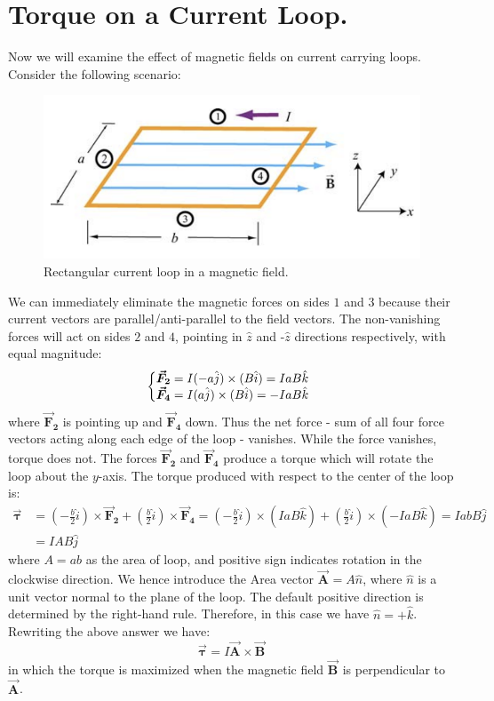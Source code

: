 \documentclass[11pt, letterpaper]{article}
\theoremstyle{definition}
\theoremstyle{remark}
\newcommand{\bv}[2][]{\bm{\vec{#2}_{#1}}}
\begin{document}
\section{Torque on a Current Loop.}\label{sec:loop}
Now we will examine the effect of magnetic fields on current carrying loops. Consider the following scenario:
\begin{figure}[h!]
	\centering
	\includegraphics[scale=0.6]{loop_torque}
	\caption{Rectangular current loop in a magnetic field.}
	\label{fig:torque_loop}
\end{figure}

We can immediately eliminate the magnetic forces on sides $1$ and $3$ because their current vectors are parallel/anti-parallel to the field vectors. The non-vanishing forces will act on sides $2$ and $4$, pointing in $\hat{z}$ and -$\hat{z}$ directions respectively, with equal magnitude:
\[
	\left\{
	\begin{array}{@{}ll@{}}
		\bv[2]{F} = I(-a\hat{j})\times (B\hat{i}) = IaB\hat{k}\\
		\bv[4]{F} = I(a\hat{j})\times (B\hat{i}) = -IaB\hat{k}
		
	\end{array}\right.
\]
where $\bv[2]{F}$ is pointing up and $\bv[4]{F}$ down. Thus the net force - sum of all four force vectors acting along each edge of the loop - vanishes. While the force vanishes, torque does not. The forces $\bv[2]{F}$ and $\bv[4]{F}$ produce a torque which will rotate the loop about the $y$-axis. The torque produced with respect to the center of the loop is:
\[
\begin{split}
	\bv{\tau} &= \left(-\frac b2\hat{i}\right)\times \bv[2]{F} + \left(\frac b2\hat{i}\right)\times\bv[4]{F}
				   = \left(-\frac b2\hat{i}\right)\times (IaB\hat{k}) + \left(\frac b2\hat{i}\right)\times (-IaB\hat{k})
				   = IabB\hat{j}\\
				   &= IAB\hat{j}
\end{split}
\]
where $A = ab$ as the area of loop, and positive sign indicates rotation in the clockwise direction. We hence introduce the Area vector $\bv{A} = A\hat{n}$, where $\hat{n}$ is a unit vector normal to the plane of the loop. The default positive direction is determined by the right-hand rule. Therefore, in this case we have $\hat{n} = +\hat{k}$. Rewriting the above answer we have: \[\bv{\tau} = I\bv{A}\times\bv{B}\] in which the torque is maximized when the magnetic field $\bv{B}$ is perpendicular to $\bv{A}$.
\end{document}
